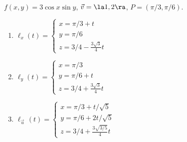 {$f(x,y) = 3\cos x\sin y$,  $\vec v = \la 1,2\ra$, $P=(\pi/3, \pi/6)$.
}
{
\begin{enumerate}
	\item $\ell_x(t) = \left\{\begin{array}{l} x = \pi/3+t\\ y = \pi/6 \\ z = 3/4 -\frac{3\sqrt{3}}{4}t \end{array} \right.$ 
	
	\item $\ell_y(t) = \left\{\begin{array}{l} x = \pi/3\\ y = \pi/6 +t\\ z = 3/4 +\frac{3\sqrt{3}}{4}t \end{array} \right.$
	
	\item $\ell_{\vec u\,}(t) = \left\{\begin{array}{l} x = \pi/3+t/\sqrt{5}\\ y = \pi/6+2t/\sqrt{5} \\ z = 3/4 +\frac{3\sqrt{3/5}}{4}t \end{array} \right.$
\end{enumerate}
}